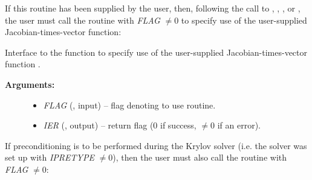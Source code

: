 \documentclass[letterpaper,10pt,english]{sphinxmanual}
\begin{document}
If this routine has been supplied by the user, then, following the
call to {\hyperref[f_interface/Usage:f/_/FARKSPGMR]{\emph{}}}, {\hyperref[f_interface/Usage:f/_/FARKSPBCG]{\emph{}}},
{\hyperref[f_interface/Usage:f/_/FARKSPTFQMR]{\emph{}}}, {\hyperref[f_interface/Usage:f/_/FARKSPFGMR]{\emph{}}} or
{\hyperref[f_interface/Usage:f/_/FARKPCG]{\emph{}}}, the user must call the routine
{\hyperref[f_interface/Usage:f/_/FARKSPILSSETJAC]{\emph{}}} with \emph{FLAG} \(\ne 0\) to specify use
of the user-supplied Jacobian-times-vector function:

\begin{fulllineitems}
\label{f_interface/Usage:f/_/FARKSPILSSETJAC}
Interface to the function {\hyperref[c_interface/User_callable:c.ARKSpilsSetJacTimesVecFn]{\emph{}}} to
specify use of the user-supplied Jacobian-times-vector function
{\hyperref[f_interface/Usage:f/_/FARKJTIMES]{\emph{}}}.
\begin{description}
\item[{\textbf{Arguments:}}] \leavevmode\begin{itemize}
\item {} 
\emph{FLAG} (, input) -- flag denoting to use
{\hyperref[f_interface/Usage:f/_/FARKJTIMES]{\emph{}}} routine.

\item {} 
\emph{IER}  (, output) -- return flag  (0 if success,
\(\ne 0\) if an error).

\end{itemize}

\end{description}

\end{fulllineitems}


If preconditioning is to be performed during the Krylov solver
(i.e. the solver was set up with \emph{IPRETYPE} \(\ne 0\)), then the
user must also call the routine {\hyperref[f_interface/Usage:f/_/FARKSPILSSETPREC]{\emph{}}} with
\emph{FLAG} \(\ne 0\):
\end{document}
